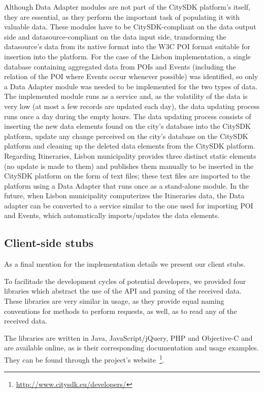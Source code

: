 \documentclass[times,doublespace]{ettauth}%
\begin{document}
Although Data Adapter modules are not part of the CitySDK platform's itself, they are essential, as they perform the important task of populating it with valuable data. 
These modules have to be CitySDK-compliant on the data output side and datasource-compliant on the data input side, transforming the datasource's data from its native format into the W3C POI format suitable for insertion into the platform. 
For the case of the Lisbon implementation, a single database containing aggregated data from \acp{POI} and Events (including the relation of the \ac{POI} where Events occur whenever possible) was identified, so only a Data Adapter module was needed to be implemented for the two types of data. 
The implemented module runs as a service and, as the volatility of the data is very low (at most a few records are updated each day), the data updating process runs once a day during the empty hours. 
The data updating process consists of inserting the new data elements found on the city's database into the CitySDK platform, update any change perceived on the city's database on the CitySDK platform and cleaning up the deleted data elements from the CitySDK platform. 
Regarding Itineraries, Lisbon municipality provides three distinct static elements (no update is made to them) and publishes them manually to be inserted in the CitySDK platform on the form of text files; these text files are imported to the platform using a Data Adapter that runs once as a stand-alone module. 
In the future, when Lisbon municipality computerizes the Itineraries data, the Data adapter can be converted to a service similar to the one used for importing \ac{POI} and Events, which automatically imports/updates the data elements.

\subsection{Client-side stubs}
As a final mention for the implementation details we present our client stubs. 

To facilitade the development cycles of potential developers, we provided four libraries which abstract the use of the API and parsing of the received data. These libraries are very similar in usage, as they provide equal naming conventions for methods to perform requests, as well, as to read any of the received data.

The libraries are written in Java, JavaScript/jQuery, PHP and Objective-C and are available online, as is their corresponding documentation and usage examples. They can be found through the project's website~\footnote{\url{http://www.citysdk.eu/developers/}}.
\end{document}
